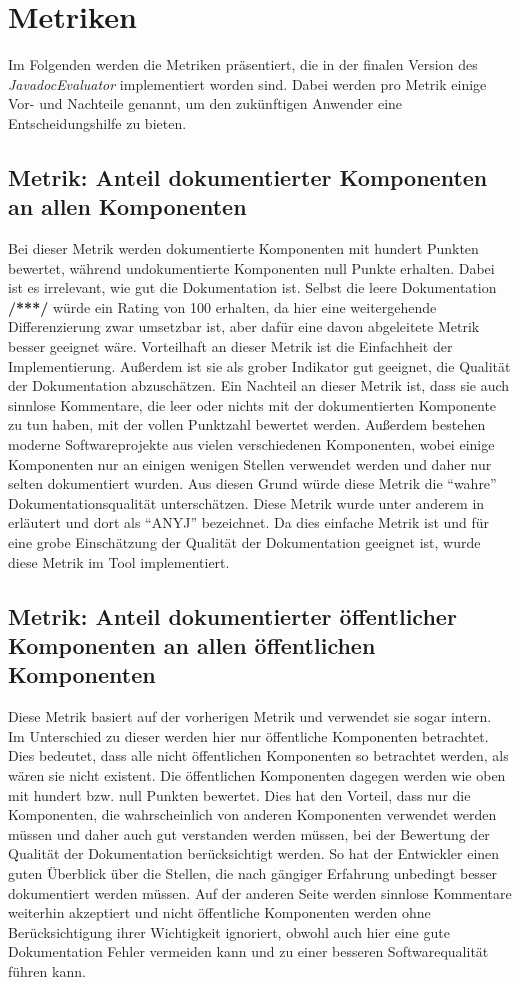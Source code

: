 \section{Metriken}\label{chapter:metrics}
Im Folgenden werden die Metriken präsentiert, die in der finalen Version des \textit{JavadocEvaluator} implementiert worden sind. Dabei werden pro Metrik einige Vor- und Nachteile genannt, um den zukünftigen Anwender eine Entscheidungshilfe zu bieten. 
\subsection{Metrik: Anteil dokumentierter Komponenten an allen Komponenten}\label{chapter:metrics_simple_comment}
Bei dieser Metrik werden dokumentierte Komponenten mit hundert Punkten bewertet, während undokumentierte Komponenten null Punkte erhalten. Dabei ist es irrelevant, wie gut die Dokumentation ist. Selbst die leere Dokumentation \textbf{/***/} würde ein Rating von 100 erhalten, da hier eine weitergehende Differenzierung zwar umsetzbar ist, aber dafür eine davon abgeleitete Metrik besser geeignet wäre. Vorteilhaft an dieser Metrik ist die Einfachheit der Implementierung. Außerdem ist sie als grober Indikator gut geeignet, die Qualität der Dokumentation abzuschätzen. Ein Nachteil an dieser Metrik ist, dass sie auch sinnlose Kommentare, die leer oder nichts mit der dokumentierten Komponente zu tun haben, mit der vollen Punktzahl bewertet werden. Außerdem bestehen moderne Softwareprojekte aus vielen verschiedenen Komponenten, wobei einige Komponenten nur an einigen wenigen Stellen verwendet werden und daher nur selten dokumentiert wurden. Aus diesen Grund würde diese Metrik die \enquote{wahre} Dokumentationsqualität unterschätzen. 
Diese Metrik wurde unter anderem in \cite[S. 5]{HowDocumentationEvolvesoverTime} erläutert und dort als \enquote{ANYJ} bezeichnet. Da dies einfache Metrik ist und für eine grobe Einschätzung der Qualität der Dokumentation geeignet ist, wurde diese Metrik im Tool implementiert.

\subsection{Metrik: Anteil dokumentierter öffentlicher Komponenten an allen öffentlichen Komponenten }
Diese Metrik basiert auf der vorherigen Metrik und verwendet sie sogar intern. Im Unterschied zu dieser werden hier nur öffentliche Komponenten betrachtet. Dies bedeutet, dass alle nicht öffentlichen Komponenten so betrachtet werden, als wären sie nicht existent. Die öffentlichen Komponenten dagegen werden wie oben mit hundert bzw. null Punkten bewertet. Dies hat den Vorteil, dass nur die Komponenten, die wahrscheinlich von anderen Komponenten verwendet werden müssen und daher auch gut verstanden werden müssen, bei der Bewertung der Qualität der Dokumentation berücksichtigt werden. So hat der Entwickler einen guten Überblick über die Stellen, die nach gängiger Erfahrung unbedingt besser dokumentiert werden müssen. Auf der anderen Seite werden sinnlose Kommentare weiterhin akzeptiert und nicht öffentliche Komponenten werden ohne Berücksichtigung ihrer Wichtigkeit ignoriert, obwohl auch hier eine gute Dokumentation Fehler vermeiden kann und zu einer besseren Softwarequalität führen kann. 

